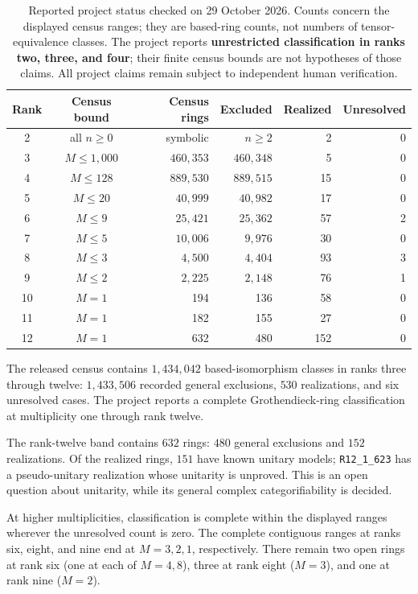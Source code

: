 \documentclass[11pt,a4paper]{article}
\begin{document}
\begin{table}[htbp]
\centering\small
\setlength{\tabcolsep}{8pt}
\renewcommand{\arraystretch}{1.12}
\begin{tabular}{@{}c c r r r r@{}}
\toprule
Rank & Census bound & Census rings & Excluded & Realized & Unresolved\\
\midrule
2 & all $n\geq0$ & symbolic & $n\geq2$ & 2 & 0\\
3 & $M\leq1{,}000$ & $460{,}353$ & $460{,}348$ & 5 & 0\\
4 & $M\leq128$ & $889{,}530$ & $889{,}515$ & 15 & 0\\
5 & $M\leq20$ & $40{,}999$ & $40{,}982$ & 17 & 0\\
6 & $M\leq9$ & $25{,}421$ & $25{,}362$ & 57 & 2\\
7 & $M\leq5$ & $10{,}006$ & $9{,}976$ & 30 & 0\\
8 & $M\leq3$ & $4{,}500$ & $4{,}404$ & 93 & 3\\
9 & $M\leq2$ & $2{,}225$ & $2{,}148$ & 76 & 1\\
10 & $M=1$ & 194 & 136 & 58 & 0\\
11 & $M=1$ & 182 & 155 & 27 & 0\\
12 & $M=1$ & 632 & 480 & 152 & 0\\
\bottomrule
\end{tabular}
\caption{Reported project status checked on 29 October 2026.
Counts concern the displayed census ranges; they are based-ring counts,
not numbers of tensor-equivalence classes. The project reports
\textbf{unrestricted classification in ranks two, three, and four};
their finite census bounds are not hypotheses of those claims.
All project claims remain subject to independent human verification.}
\label{tab:scope}
\end{table}

The released census contains $1{,}434{,}042$ based-isomorphism classes in
ranks three through twelve: $1{,}433{,}506$ recorded general exclusions,
$530$ realizations, and six unresolved cases. The project reports a complete
Grothendieck-ring classification at multiplicity one through rank twelve.

The rank-twelve band contains $632$ rings: $480$ general exclusions
and $152$ realizations. Of the realized rings, $151$ have known unitary
models; \texttt{R12\_1\_623} has a pseudo-unitary realization whose
unitarity is unproved. This is an open question about unitarity, while its
general complex categorifiability is decided.

At higher multiplicities, classification is complete within the displayed
ranges wherever the unresolved count is zero. The complete contiguous
ranges at ranks six, eight, and nine end at $M=3,2,1$, respectively.
There remain two open rings at rank six (one at each of $M=4,8$),
three at rank eight ($M=3$), and one at rank nine ($M=2$).
\end{document}
